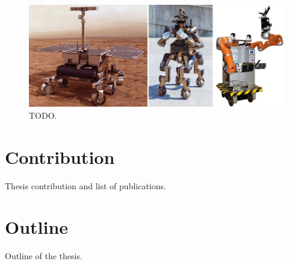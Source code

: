 \begin{figure}
    \centering
    \includegraphics[width=\textwidth]{figures/01-introduction/SWMRs-2.jpg}
    \caption{TODO.}
    \label{fig:introduction:SWMRs-2}
\end{figure}


\section{Contribution}
Thesis contribution and list of publications.

\section{Outline}
Outline of the thesis.
